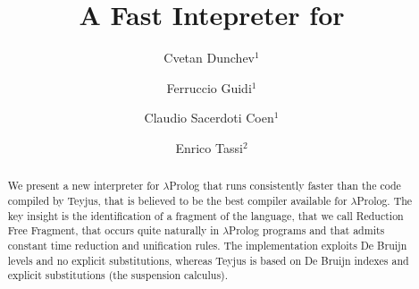 \documentclass{llncs}
\begin{document}
\title{A Fast Intepreter for \lp}





\author{Cvetan Dunchev$^1$ \and
        Ferruccio Guidi$^1$ \and
        Claudio Sacerdoti Coen$^1$ \and
        Enrico Tassi$^2$}






\newcommand{\frag}{Reduction Free Fragment}
\newcommand{\lp}{$\lambda$Prolog}
\newcommand{\elpi}{ELPI}
\newcommand{\CSC}[1]{\textcolor{red}{#1}}

\maketitle

\begin{abstract}
We present a new interpreter for \lp{} that runs consistently faster than
the code compiled by Teyjus, that is believed to be the best compiler
available for \lp. The key insight is the identification of a fragment of
the language, that we call \frag, that occurs quite naturally in \lp{}
programs and that admits constant time reduction and unification rules.
The implementation exploits De Bruijn levels and no explicit substitutions,
whereas Teyjus is based on De Bruijn indexes and explicit substitutions (the
suspension calculus).
\end{abstract}
\end{document}
